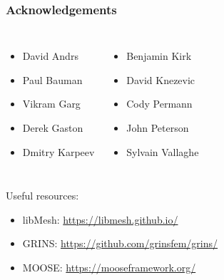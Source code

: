 \documentclass[mathserif]{beamer}
\begin{document}
\begin{frame}
\frametitle{Acknowledgements}

\begin{columns}


\begin{itemize}
\item David Andrs
\item Paul Bauman
\item Vikram Garg
\item Derek Gaston
\item Dmitry Karpeev 
\end{itemize}

\begin{itemize}
\item Benjamin Kirk
\item David Knezevic
\item Cody Permann
\item John Peterson 
\item Sylvain Vallaghe
\end{itemize}

\end{columns}

\begin{columns}[c] 
\begin{column}{.5\textwidth} 
\begin{block}{}
\end{block}
\end{column}
\end{columns}
\begin{center}
\end{center}

Useful resources:
\begin{itemize}
\item libMesh: \url{https://libmesh.github.io/}
\item GRINS: \url{https://github.com/grinsfem/grins/}
\item MOOSE: \url{https://mooseframework.org/}
\end{itemize}

\end{frame}

 
\end{document}
